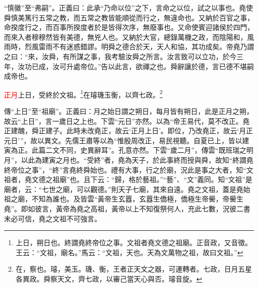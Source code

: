 {\noindent\shu{}\fzkt “慎徽”至“弗嗣”。正義曰：此承“乃命以位”之下，言命之以位，試之以事也。堯使舜慎美篤行五常之教，而五常之教皆能順從而行之，無違命也。又納於百官之事，命揆度行之，而百事所揆度者於是皆得次序，無廢事也。又命使賓迎諸侯於四門，而來入者穆穆然皆有美德，無兇人也。又納於大官，總錄萬機之政，而陰陽和，風雨時，烈風雷雨不有迷惑錯謬。明舜之德合於天，天人和協，其功成矣。帝堯乃謂之曰：“來，汝舜，有所謀之事，我考驗汝舜之所言。汝言致可以立功，於今三年，汝功已成，汝可升處帝位。”告以此言，欲禪之也。舜辭讓於德，言已德不堪嗣成帝也。 \par}

\textcolor{red}{正月}上日，受終於文祖。\footnote{上日，朔日也。終謂堯終帝位之事。文祖者堯文德之祖廟。正音政，又音徵。王云：“文祖，廟名。”馬云：“文祖，天也。天為文萬物之祖，故曰文祖。”}在璿璣玉衡，以齊七政。\footnote{在，察也。璿，美玉。璣、衡，王者正天文之器，可運轉者。七政，日月五星各異政。舜察天文，齊七政，以審己當天心與否。璿音旋。}

{\noindent\zhuan{}\fzbyks 傳“上日”至“祖廟”。正義曰：月之始日謂之朔日，每月皆有朔日，此是正月之朔，故云“上日”，言一歲日之上也。下雲“元日”亦然。以為“帝王易代，莫不改正。堯正建醜，舜正建子。此時未改堯正，故云‘正月上日’。即位，乃改堯正，故云‘月正元日’”，故以異文。先儒王肅等以為“惟殷周改正，易民視聽。自夏已上，皆以建寅為正。此篇二文不同，史異辭耳”。孔意亦然。下雲“歲二月”，傳雲“既班瑞之明月”，以此為建寅之月也。“受終”者，堯為天子，於此事終而授與舜，故知“終謂堯終帝位之事”，“終”言堯終舜始也。禮有大事，行之於廟，況此是事之大者，知“文祖者，堯文德之祖廟”也。且下云：“歸，格於藝祖。”“藝”、“文”義同。知“文祖”是廟者，云：“七世之廟，可以觀德。”則天子七廟，其來自遠。堯之文祖，蓋是堯始祖之廟，不知為誰也。及皆雲“黃帝生玄囂，玄囂生僑極，僑極生帝嚳，帝嚳生堯”。即如彼言，黃帝為堯之高祖，黃帝以上不知復祭何人，充此七數，況彼二書未必可信，堯之文祖不可強言。 \par}


